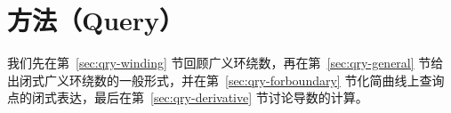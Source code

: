 

\section{方法（Query）} \label{sec:qry-method}
我们先在第~\ref{sec:qry-winding} 节回顾广义环绕数，再在第~\ref{sec:qry-general} 节给出闭式广义环绕数的一般形式，并在第~\ref{sec:qry-forboundary} 节化简曲线上查询点的闭式表达，最后在第~\ref{sec:qry-derivative} 节讨论导数的计算。

